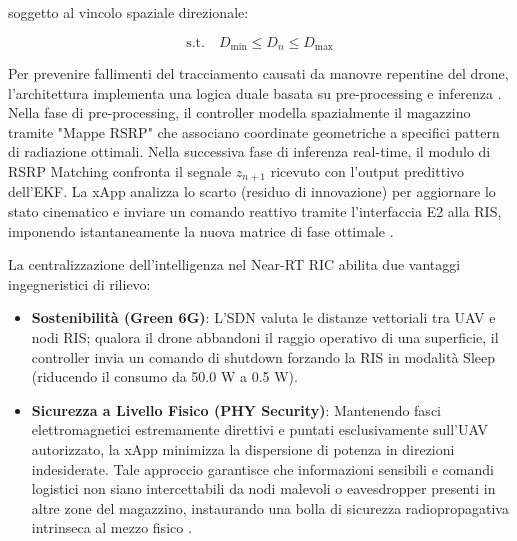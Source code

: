 \documentclass[twoside]{article}
\begin{document}
soggetto al vincolo spaziale direzionale:

\begin{equation}
\text{s.t.} \quad D_{\min} \le D_n \le D_{\max}
\label{eq:ric_constraint}
\end{equation}

Per prevenire fallimenti del tracciamento causati da manovre repentine del drone, l'architettura implementa una logica duale basata su pre-processing e inferenza \cite{Lien2024}. Nella fase di pre-processing, il controller modella spazialmente il magazzino tramite "Mappe RSRP" che associano coordinate geometriche a specifici pattern di radiazione ottimali. Nella successiva fase di inferenza real-time, il modulo di RSRP Matching confronta il segnale $z_{n+1}$ ricevuto con l'output predittivo dell'EKF. La xApp analizza lo scarto (residuo di innovazione) per aggiornare lo stato cinematico e inviare un comando reattivo tramite l'interfaccia E2 alla RIS, imponendo istantaneamente la nuova matrice di fase ottimale \cite{Lien2024}.

La centralizzazione dell'intelligenza nel Near-RT RIC abilita due vantaggi ingegneristici di rilievo:
\begin{itemize}
    \item \textbf{Sostenibilità (Green 6G)}: L'SDN valuta le distanze vettoriali tra UAV e nodi RIS; qualora il drone abbandoni il raggio operativo di una superficie, il controller invia un comando di shutdown forzando la RIS in modalità Sleep (riducendo il consumo da 50.0 W a 0.5 W).
    \item \textbf{Sicurezza a Livello Fisico (PHY Security)}: Mantenendo fasci elettromagnetici estremamente direttivi e puntati esclusivamente sull'UAV autorizzato, la xApp minimizza la dispersione di potenza in direzioni indesiderate. Tale approccio garantisce che informazioni sensibili e comandi logistici non siano intercettabili da nodi malevoli o eavesdropper presenti in altre zone del magazzino, instaurando una bolla di sicurezza radiopropagativa intrinseca al mezzo fisico \cite{Lien2024}.
\end{itemize}
\end{document}
